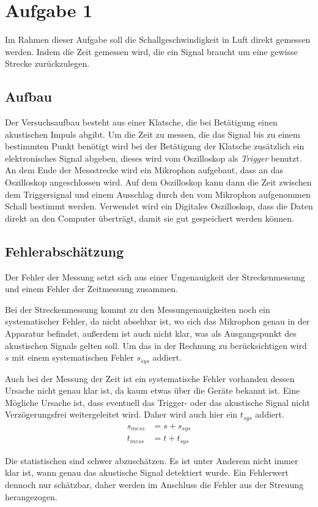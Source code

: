 \section{Aufgabe 1}
Im Rahmen dieser Aufgabe soll die Schallgeschwindigkeit in Luft direkt gemessen werden. Indem die Zeit gemessen wird, die ein Signal braucht um eine gewisse Strecke zurückzulegen.
\subsection{Aufbau}
Der Versuchsaufbau besteht aus einer Klatsche, die bei Betätigung einen akustischen Impuls abgibt. Um die Zeit zu messen, die das Signal bis zu einem bestimmten Punkt benötigt wird bei der Betätigung der Klatsche zusätzlich ein elektronisches Signal abgeben, dieses wird vom Oszilloskop als \textit{Trigger} benutzt. An dem Ende der Messstrecke wird ein Mikrophon aufgebaut, dass an das Oszilloskop angeschlossen wird. Auf dem Oszilloskop kann dann die Zeit zwischen dem Triggersignal und einem Ausschlag durch den vom Mikrophon aufgenommen Schall bestimmt werden. Verwendet wird ein Digitales Oszilloskop, dass die Daten direkt an den Computer überträgt, damit sie gut gespeichert werden können.
\subsection{Fehlerabschätzung}
Der Fehler der Messung setzt sich aus einer Ungenauigkeit der Streckenmessung und einem Fehler der Zeitmessung zusammen.

Bei der Streckenmessung kommt zu den Messungenauigkeiten noch ein systematischer Fehler, da nicht absehbar ist, wo sich das Mikrophon genau in der Apparatur befindet, außerdem ist auch nicht klar, was als Ausgangspunkt des akustischen Signals gelten soll. Um das in der Rechnung zu berücksichtigen wird \(s\) mit einem systematischen Fehler \(s_{sys}\) addiert.

Auch bei der Messung der Zeit ist ein systematische Fehler vorhanden dessen Ursache nicht genau klar ist, da kaum etwas über die Geräte bekannt ist. Eine Mögliche Ursache ist, dass eventuell das Trigger- oder das akustische Signal nicht Verzögerungsfrei weitergeleitet wird. Daher wird auch hier ein \(t_{sys}\) addiert.
\begin{align}
s_{mess} &= s + s_{sys}\\
t_{mess} &= t + t_{sys}
\end{align}

Die statistischen sind schwer abzuschätzen. Es ist unter Anderem nicht immer klar ist, wann genau das akustische Signal detektiert wurde. Ein Fehlerwert dennoch nur schätzbar, daher werden im Anschluss die Fehler aus der Streuung herangezogen.

